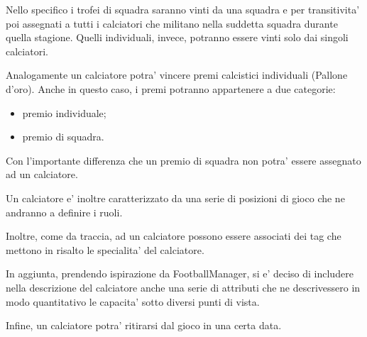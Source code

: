 Nello specifico i trofei di squadra saranno vinti da una squadra e per transitivita' poi
assegnati a tutti i calciatori che militano nella suddetta squadra durante quella stagione.
Quelli individuali, invece, potranno essere vinti solo dai singoli calciatori.

Analogamente un calciatore potra' vincere premi calcistici individuali (Pallone d'oro).
Anche in questo caso, i premi potranno appartenere a due categorie:
\begin{itemize}
	\item premio individuale;
	\item premio di squadra.
\end{itemize}

Con l'importante differenza che un premio di squadra non potra' essere assegnato ad un
calciatore.

Un calciatore e' inoltre caratterizzato da una serie di posizioni di gioco che ne andranno a
definire i ruoli.

Inoltre, come da traccia, ad un calciatore possono essere associati dei tag che mettono in
risalto le specialita' del calciatore.

In aggiunta, prendendo ispirazione da FootballManager, si e' deciso di includere nella
descrizione del calciatore anche una serie di attributi che ne descrivessero in modo quantitativo
le capacita' sotto diversi punti di vista.

Infine, un calciatore potra' ritirarsi dal gioco in una certa data.